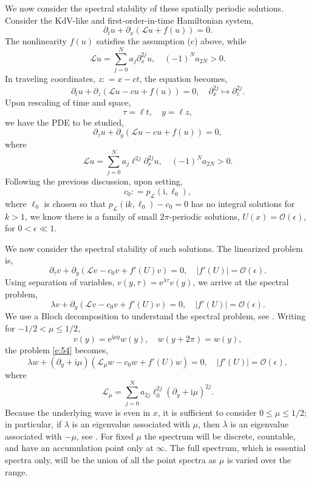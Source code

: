 \documentclass[review,onefignum,onetabnum]{siamart171218}
\def\coloneqq{\mathrel{\mathop:}=}
\newcommand{\rme}{\mathrm{e}}
\newcommand{\rmi}{\mathrm{i}}
\newcommand{\calL}{\mathcal{L}}
\newcommand{\calO}{\mathcal{O}}
\begin{document}

We now consider the spectral stability of these spatially periodic solutions.
Consider the KdV-like and first-order-in-time Hamiltonian system,
\begin{equation}\label{e:52}
\partial_t u+\partial_x\left(\calL u+f(u)\right)=0.
\end{equation}
The nonlinearity $f(u)$ satisfies the assumption (c) above, while
\[
\calL u=\sum_{j=0}^Na_j\partial_x^{2j}u,\quad (-1)^Na_{2N}>0.
\]
In traveling coordinates, $z\coloneqq x-ct$, the equation becomes,
\[
\partial_tu+\partial_z\left(\calL u-cu+f(u)\right)=0,\quad
\partial_x^{2j}\mapsto\partial_z^{2j}.
\]
Upon rescaling of time and space,
\[
\tau=\ell t,\quad y=\ell z,
\]
we have the PDE to be studied,
\begin{equation}\label{e:53}
\partial_\tau u+\partial_y\left(\calL u-cu+f(u)\right)=0,
\end{equation}
where
\[
\calL u=\sum_{j=0}^Na_j\ell^{2j}\partial_x^{2j}u,\quad (-1)^Na_{2N}>0.
\]
Following the previous discussion, upon setting,
\[
c_0\coloneqq p_{\calL}(\rmi,\ell_0),
\]
where $\ell_0$ is chosen so that $p_{\calL}(\rmi k,\ell_0)-c_0=0$ has no integral solutions for $k>1$, we know there is a family of small $2\pi$-periodic solutions,
$U(x)=\calO(\epsilon)$, for $0<\epsilon\ll1$.

We now consider the spectral stability of such solutions. The linearized
problem is,
\[
\partial_\tau v+\partial_y\left(\calL v-c_0v+f'(U)v\right)=0,\quad |f'(U)|=\calO(\epsilon).
\]
Using separation of variables, $v(y,\tau)=\rme^{\lambda\tau}v(y)$, we arrive
at the spectral problem,
\begin{equation}\label{e:54}
\lambda v+\partial_y\left(\calL v-c_0v+f'(U)v\right)=0,\quad |f'(U)|=\calO(\epsilon).
\end{equation}
We use a Bloch decomposition to understand the spectral problem, see
\cite[Chapter~3.3]{kapitula:sad13}. Writing for $-1/2<\mu\le1/2$,
\[
v(y)=\rme^{\rmi\mu y}w(y),\quad w(y+2\pi)=w(y),
\]
the problem \cref{e:54} becomes,
\begin{equation}\label{e:55}
\lambda w+(\partial_y+\rmi \mu)\left(\calL_\mu w-c_0w+f'(U)w\right)=0,\quad |f'(U)|=\calO(\epsilon),
\end{equation}
where
\[
\calL_\mu=\sum_{j=0}^Na_{2j}\ell_0^{2j}(\partial_y+\rmi \mu)^{2j}.
\]
Because
the underlying wave is even in $x$, it is sufficient to consider
$0\le\mu\le1/2$; in particular, if
$\lambda$ is an eigenvalue associated with $\mu$, then $\overline{\lambda}$
is an eigenvalue associated with $-\mu$, see \cite[Section~4]{haragus:ots08}. For fixed $\mu$ the spectrum will be
discrete, countable, and have an accumulation point only at $\infty$. The
full spectrum, which is essential spectra only, will be the union of all the
point spectra as $\mu$ is varied over the range.
\end{document}
